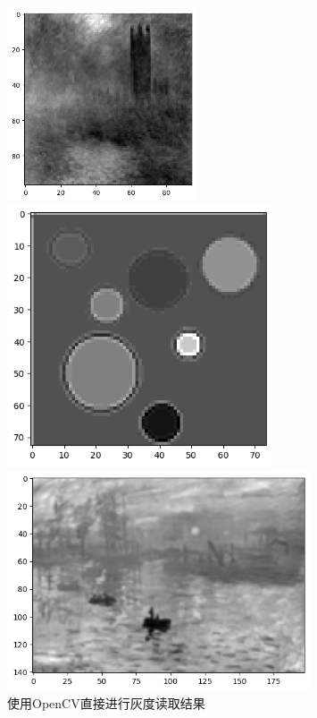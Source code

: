 \documentclass{article}
\begin{document}
\begin{figure}[htbp]
	\centering
		\begin{minipage}[c]{0.3\textwidth} %
			\centering
			\includegraphics[width=0.5\textwidth]{./report/output4.png} %
			
		\end{minipage}%
		\begin{minipage}[c]{0.2\textwidth}
			\centering
			\includegraphics[width=0.7\textwidth]{./report/output5.png}
			
		\end{minipage}
		\begin{minipage}[c]{0.2\textwidth}
			\centering
			\includegraphics[width=0.8\textwidth]{./report/output6.png}
			
		\end{minipage}
		\caption*{使用OpenCV直接进行灰度读取结果}
\end{figure}
\end{document}
